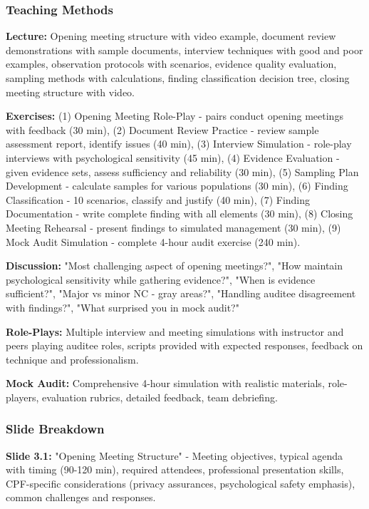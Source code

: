 \documentclass[11pt,a4paper]{article}
\begin{document}
\subsubsection{Teaching Methods}
\textbf{Lecture:} Opening meeting structure with video example, document review demonstrations with sample documents, interview techniques with good and poor examples, observation protocols with scenarios, evidence quality evaluation, sampling methods with calculations, finding classification decision tree, closing meeting structure with video.

\textbf{Exercises:} (1) Opening Meeting Role-Play - pairs conduct opening meetings with feedback (30 min), (2) Document Review Practice - review sample assessment report, identify issues (40 min), (3) Interview Simulation - role-play interviews with psychological sensitivity (45 min), (4) Evidence Evaluation - given evidence sets, assess sufficiency and reliability (30 min), (5) Sampling Plan Development - calculate samples for various populations (30 min), (6) Finding Classification - 10 scenarios, classify and justify (40 min), (7) Finding Documentation - write complete finding with all elements (30 min), (8) Closing Meeting Rehearsal - present findings to simulated management (30 min), (9) Mock Audit Simulation - complete 4-hour audit exercise (240 min).

\textbf{Discussion:} "Most challenging aspect of opening meetings?", "How maintain psychological sensitivity while gathering evidence?", "When is evidence sufficient?", "Major vs minor NC - gray areas?", "Handling auditee disagreement with findings?", "What surprised you in mock audit?"

\textbf{Role-Plays:} Multiple interview and meeting simulations with instructor and peers playing auditee roles, scripts provided with expected responses, feedback on technique and professionalism.

\textbf{Mock Audit:} Comprehensive 4-hour simulation with realistic materials, role-players, evaluation rubrics, detailed feedback, team debriefing.

\subsubsection{Slide Breakdown}

\textbf{Slide 3.1:} "Opening Meeting Structure" - Meeting objectives, typical agenda with timing (90-120 min), required attendees, professional presentation skills, CPF-specific considerations (privacy assurances, psychological safety emphasis), common challenges and responses.
\end{document}
